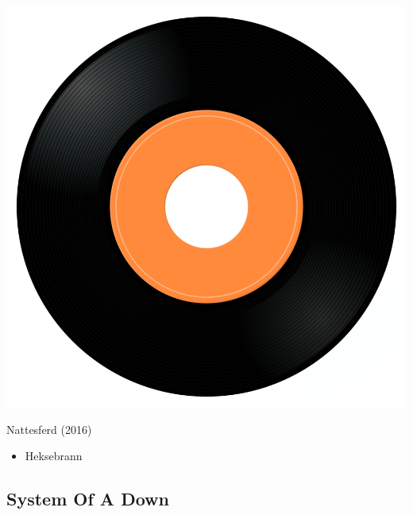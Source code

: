 \begin{minipage}[t]{0.25\textwidth}\vspace{0pt}
\captionsetup{type=figure}
\includegraphics[width=\textwidth]{Images/cover.png}
\caption*{Nattesferd (2016)}
\end{minipage}
\begin{minipage}[t]{0.25\textwidth}\vspace{0pt}
\begin{itemize}[nosep,leftmargin=1em,labelwidth=*,align=left]
	\setlength{\itemsep}{0pt}
	\item Heksebrann
\end{itemize}
\end{minipage}

\subsection{System Of A Down}


